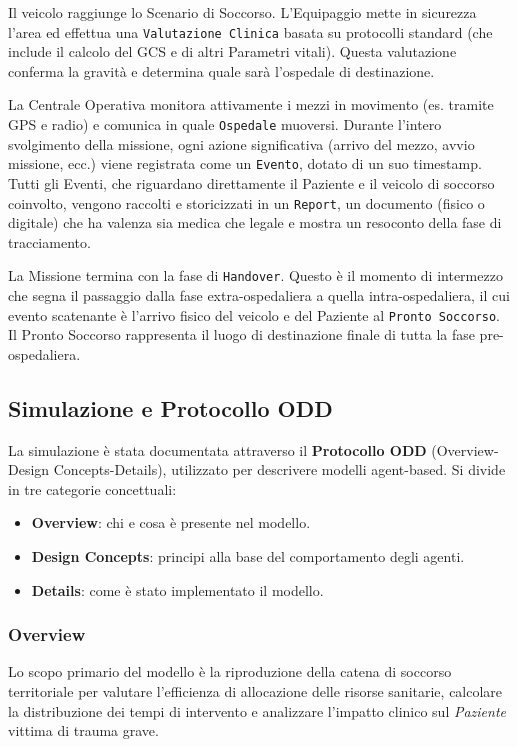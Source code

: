 \documentclass[12pt,a4paper,oneside]{article}
\begin{document}
Il veicolo raggiunge lo Scenario di Soccorso. L'Equipaggio mette in sicurezza 
l'area ed effettua una \texttt{Valutazione Clinica} basata su protocolli standard 
(che include il calcolo del GCS e di altri Parametri vitali).
Questa valutazione conferma la gravità e determina quale sarà l'ospedale 
di destinazione.

La Centrale Operativa monitora attivamente i mezzi in movimento (es. tramite GPS
 e radio) e comunica in quale \texttt{Ospedale} muoversi.
Durante l'intero svolgimento della missione, ogni azione significativa
 (arrivo del mezzo, avvio missione, ecc.) viene registrata come un \texttt{Evento}, dotato di un suo timestamp. 
 Tutti gli Eventi, che riguardano direttamente il Paziente e il veicolo di 
 soccorso coinvolto, vengono raccolti e storicizzati in un \texttt{Report}, un 
 documento (fisico o digitale) che ha valenza sia medica che legale e mostra un 
 resoconto della fase di tracciamento.

La Missione termina con la fase di \texttt{Handover}. Questo è il momento di 
intermezzo che segna il passaggio dalla fase extra-ospedaliera a quella 
intra-ospedaliera, il cui evento scatenante è l'arrivo fisico del veicolo e 
del Paziente al \texttt{Pronto Soccorso}. Il Pronto Soccorso rappresenta il luogo 
di destinazione finale di tutta la fase pre-ospedaliera.


\subsection{Simulazione e Protocollo ODD}
La simulazione è stata documentata attraverso il \textbf{Protocollo ODD} (Overview-Design Concepts-Details), 
utilizzato per descrivere modelli agent-based. Si divide in tre categorie concettuali:
\begin{itemize}
    \item \textbf{Overview}: chi e cosa è presente nel modello.
    \item \textbf{Design Concepts}: principi alla base del comportamento degli agenti.
    \item \textbf{Details}: come è stato implementato il modello.
\end{itemize}

\subsubsection{Overview}
Lo scopo primario del modello è la riproduzione della catena di soccorso
territoriale per valutare l'efficienza di allocazione delle risorse sanitarie, 
calcolare la distribuzione dei tempi di intervento e analizzare l'impatto clinico 
sul \textit{Paziente} vittima di trauma grave. 
\end{document}
